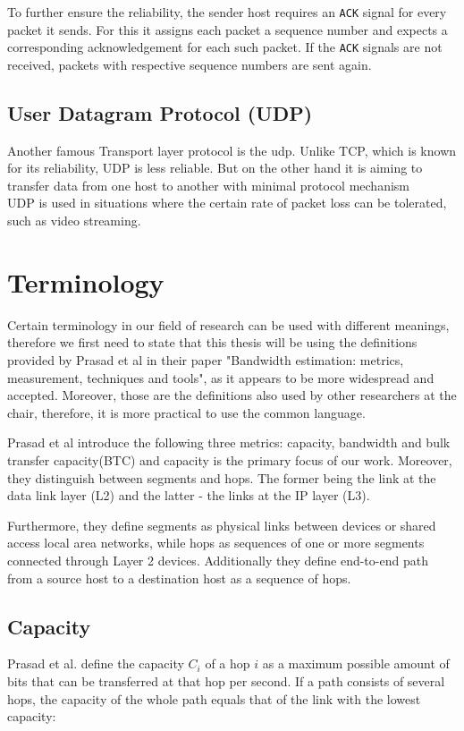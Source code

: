 To further ensure the reliability, the sender host requires an \texttt{ACK} signal for every packet it sends. For this it assigns each packet a sequence number and expects a corresponding acknowledgement for each such packet. If the \texttt{ACK} signals are not received, packets with respective sequence numbers are sent again\cite{ietf_tcp}.



\subsection{User Datagram Protocol (UDP)}
Another famous Transport layer protocol is the \acl{udp}. Unlike TCP, which is known for its reliability, UDP is less reliable. But on the other hand it is aiming to transfer data from one host to another with minimal protocol mechanism\cite{ietf_udp}\\
UDP is used in situations where the certain rate of packet loss can be tolerated, such as video streaming. 



\section{Terminology}
Certain terminology in our field of research can be used with different meanings, therefore we first need to state that this thesis will be using the definitions provided by Prasad et al in their paper "Bandwidth estimation: metrics, measurement, techniques and tools"\cite{Prasad2003}, as it appears to be more widespread and accepted. Moreover, those are the definitions also used by other researchers at the chair, therefore, it is more practical to use the common language.

Prasad et al\cite{Prasad2003} introduce the following three metrics: capacity, bandwidth and bulk transfer capacity(BTC) and capacity is the primary focus of our work.
Moreover, they distinguish between segments and hops. The former being the link at the data link layer (L2) and the latter - the links at the IP layer (L3). 

Furthermore, they define segments as physical links between devices or shared access local area networks, while hops as sequences of one or more segments connected through Layer 2 devices. Additionally they define end-to-end path from a source host to a destination host as a sequence of hops.


\subsection*{Capacity}
Prasad et al. define the capacity $C_i$ of a hop $i$ as a maximum possible amount of bits that can be transferred at that hop per second\cite{Prasad2003}. If a path consists of several hops, the capacity of the whole path equals that of the link with the lowest capacity:

